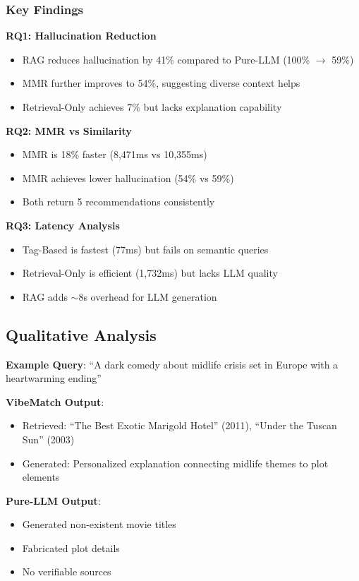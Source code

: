 \documentclass[11pt,a4paper]{article}
\begin{document}
\subsubsection{Key Findings}

\textbf{RQ1: Hallucination Reduction}
\begin{itemize}
    \item RAG reduces hallucination by 41\% compared to Pure-LLM (100\% $\rightarrow$ 59\%)
    \item MMR further improves to 54\%, suggesting diverse context helps
    \item Retrieval-Only achieves 7\% but lacks explanation capability
\end{itemize}

\textbf{RQ2: MMR vs Similarity}
\begin{itemize}
    \item MMR is 18\% faster (8,471ms vs 10,355ms)
    \item MMR achieves lower hallucination (54\% vs 59\%)
    \item Both return 5 recommendations consistently
\end{itemize}

\textbf{RQ3: Latency Analysis}
\begin{itemize}
    \item Tag-Based is fastest (77ms) but fails on semantic queries
    \item Retrieval-Only is efficient (1,732ms) but lacks LLM quality
    \item RAG adds $\sim$8s overhead for LLM generation
\end{itemize}

\subsection{Qualitative Analysis}

\textbf{Example Query}: ``A dark comedy about midlife crisis set in Europe with a heartwarming ending''

\textbf{VibeMatch Output}: 
\begin{itemize}
    \item Retrieved: ``The Best Exotic Marigold Hotel'' (2011), ``Under the Tuscan Sun'' (2003)
    \item Generated: Personalized explanation connecting midlife themes to plot elements
\end{itemize}

\textbf{Pure-LLM Output}:
\begin{itemize}
    \item Generated non-existent movie titles
    \item Fabricated plot details
    \item No verifiable sources
\end{itemize}
\end{document}
